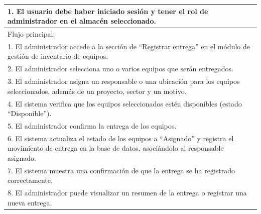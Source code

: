 \documentclass[stu, 12pt, letterpaper, donotrepeattitle, floatsintext, natbib]{apa7}
\begin{document}
\begin{longtable}{@{} p{16.5cm} @{}}
    1. El usuario debe haber iniciado sesión y tener el rol de administrador en el almacén seleccionado.                                                                                                                   \\ \midrule
    Flujo principal:                                                                                                                                                                                                       \\
    1. El administrador accede a la sección de ``Registrar entrega'' en el módulo de gestión de inventario de equipos.                                                                                                     \\
    2. El administrador selecciona uno o varios equipos que serán entregados.                                                                                                                                              \\
    3. El administrador asigna un responsable o una ubicación para los equipos seleccionados, además de un proyecto, sector y un motivo.                                                                                   \\
    4. El sistema verifica que los equipos seleccionados estén disponibles (estado ``Disponible'').                                                                                                                        \\
    5. El administrador confirma la entrega de los equipos.                                                                                                                                                                \\
    6. El sistema actualiza el estado de los equipos a ``Asignado'' y registra el movimiento de entrega en la base de datos, asociándolo al responsable asignado.                                                          \\
    7. El sistema muestra una confirmación de que la entrega se ha registrado correctamente.                                                                                                                               \\
    8. El administrador puede visualizar un resumen de la entrega o registrar una nueva entrega.                                                                                                                           \\ \midrule

\end{longtable}
\end{document}
